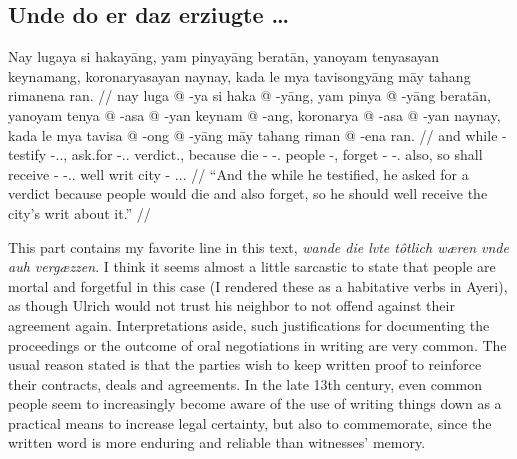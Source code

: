 \documentclass[12pt,paper=a4]{scrartcl}
\newcommand{\fw}[1]{\textit{#1}} %
\begin{document}
\subsection*{Unde do er daz erziugte …}


\ex \begingl
	\glpreamble Nay lugaya si hakayāng, yam pinyayāng beratān, yanoyam 
		tenyasayan keynamang, koronaryasayan naynay, kada le mya 
		tavisongyāng māy tahang rimanena ran. //
	\gla nay luga @ -ya si haka @ -yāng, yam pinya @ -yāng beratān, yanoyam 
		tenya @ -asa @ -yan keynam @ -ang, koronarya @ -asa @ -yan 
		naynay, kada le mya tavisa @ -ong @ -yāng māy tahang riman @ 
		-ena ran. //
	\glb and while -\Loc{} \Rel{} testify -\Tsg{}.\M{}.\Aarg{}, \DatT{} 
		ask.for -\Tsg{}.\M{}.\Aarg{} verdict.\Top{}, because die 
		-\Hab{} -\Tpl{}.\M{} people -\Aarg{}, forget -\Hab{} 
		-\Tpl{}.\M{} also, so \PatT{} shall receive -\Irr{} 
		-\Tsg{}.\M{}.\Aarg{} well writ city -\Gen{} 
		\Tsg{}.\Inan{}.\Gen{}. //
	\glft \enquote{And the while he testified, he asked for a verdict 
		because people would die and also forget, so he should well 
		receive the city's writ about it.} //
\endgl \xe

This part contains my favorite line in this text, \fw{wande die lvte tôtlich 
wæren vnde auh vergæzzen}. I think it seems almost a little sarcastic to state 
that people are mortal and forgetful in this case (I rendered these as a 
habitative verbs in Ayeri), as though Ulrich would not trust his neighbor to not 
offend against their agreement again. Interpretations aside, such justifications 
for documenting the proceedings or the outcome of oral negotiations in writing 
are very common. The usual reason stated is that the parties wish to keep 
written proof to reinforce their contracts, deals and agreements. In the late 
13th century, even common people seem to increasingly become aware of the use 
of writing things down as a practical means to increase legal certainty, but 
also to commemorate, since the written word is more enduring and reliable than 
witnesses' memory.
\end{document}
